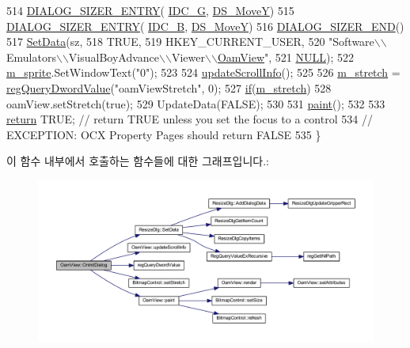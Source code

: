 \begin{DoxyCode}
514     \mbox{\hyperlink{_resize_dlg_8h_a0e9ee7a18c54003893895a009f5d79c8}{DIALOG\_SIZER\_ENTRY}}( \mbox{\hyperlink{resource_8h_a35ca279082796c6a98895939aa06826d}{IDC\_G}}, \mbox{\hyperlink{_resize_dlg_8h_ae5309071be822a4dae5cb33a131f6180}{DS\_MoveY}})
515     \mbox{\hyperlink{_resize_dlg_8h_a0e9ee7a18c54003893895a009f5d79c8}{DIALOG\_SIZER\_ENTRY}}( \mbox{\hyperlink{resource_8h_a96306052e53348b1e760b8dcabf2b0c7}{IDC\_B}}, \mbox{\hyperlink{_resize_dlg_8h_ae5309071be822a4dae5cb33a131f6180}{DS\_MoveY}})    
516     \mbox{\hyperlink{_resize_dlg_8h_aeac0c1e32f30e0763df5736e4b3ea50a}{DIALOG\_SIZER\_END}}()
517     \mbox{\hyperlink{class_resize_dlg_a6a3965f44a0c2f5ba9aaa798a9a81df5}{SetData}}(sz,
518             TRUE,
519             HKEY\_CURRENT\_USER,
520             "Software\(\backslash\)\(\backslash\)Emulators\(\backslash\)\(\backslash\)VisualBoyAdvance\(\backslash\)\(\backslash\)Viewer\(\backslash\)\(\backslash\)\mbox{\hyperlink{class_oam_view}{OamView}}",
521             \mbox{\hyperlink{getopt1_8c_a070d2ce7b6bb7e5c05602aa8c308d0c4}{NULL}});
522   \mbox{\hyperlink{class_oam_view_a808b936a1493d14a2a4bf27f3030af14}{m\_sprite}}.SetWindowText("0");
523 
524   \mbox{\hyperlink{class_oam_view_ae51c17aebff73f557073546febb45eba}{updateScrollInfo}}();
525 
526   \mbox{\hyperlink{class_oam_view_a0eeb8a1eeda8d53816c2696d70d61da4}{m\_stretch}} = \mbox{\hyperlink{_reg_8cpp_a150640889ffff4851ee26d7b999ec7c3}{regQueryDwordValue}}("oamViewStretch", 0);
527   \mbox{\hyperlink{arm-new_8h_a93120066fd6daa54150af823953378d1}{if}}(\mbox{\hyperlink{class_oam_view_a0eeb8a1eeda8d53816c2696d70d61da4}{m\_stretch}})
528     oamView.setStretch(true);
529   UpdateData(FALSE);
530   
531   \mbox{\hyperlink{class_oam_view_af9092e04b559ef87670e18dd42c45669}{paint}}();
532   
533   \mbox{\hyperlink{gb_codes_8h_a9717e7bbecb906637e86cef6da3d83c2}{return}} TRUE;  \textcolor{comment}{// return TRUE unless you set the focus to a control}
534                 \textcolor{comment}{// EXCEPTION: OCX Property Pages should return FALSE}
535 \}
\end{DoxyCode}
이 함수 내부에서 호출하는 함수들에 대한 그래프입니다.\+:
\nopagebreak
\begin{figure}[H]
\begin{center}
\leavevmode
\includegraphics[width=350pt]{class_oam_view_a925c72977181efd7be81b302af7ed071_cgraph}
\end{center}
\end{figure}
\mbox{\label{class_oam_view_a139d46b95c3f0a9198e7d4fc134f88c2}} 
